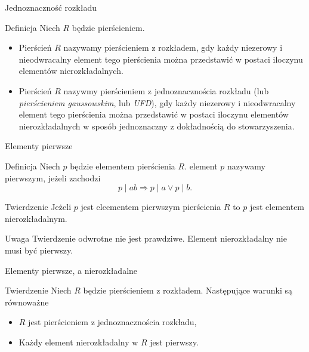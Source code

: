 \documentclass{beamer}
\begin{document}
\begin{frame}{Jednoznaczność rozkładu}
    \begin{block}{Definicja}
        Niech $R$ będzie pierścieniem. 
        \begin{itemize}
            \item Pierścień $R$ nazywamy pierścieniem z rozkładem, gdy każdy niezerowy i nieodwracalny element tego pierścienia można przedstawić w postaci iloczynu elementów nierozkładalnych.
            \item Pierścień $R$ nazywmy \alert{pierścieniem z jednoznacznościa rozkładu} (lub 
            \textit{pierścieniem gaussowskim}, lub \textit{UFD}), gdy każdy niezerowy i nieodwracalny element tego pierścienia można
            przedstawić w postaci iloczynu elementów nierozkładalnych w sposób jednoznaczny z dokładnością do stowarzyszenia.
        \end{itemize}
    \end{block}
\end{frame}

\begin{frame}{Elementy pierwsze}
    \begin{block}{Definicja}
        Niech $p$ będzie elementem pierścienia $R$. element $p$ nazywamy \alert{pierwszym}, jeżeli zachodzi 
        $$p \mid ab \Rightarrow p \mid a \lor p \mid b.$$
    \end{block}
    \pause 
    \begin{block}{Twierdzenie}
        Jeżeli $p$ jest eleementem pierwszym pierścienia $R$ to $p$ jest elementem nierozkładalnym. 
    \end{block}
    \pause 
    \begin{alertblock}{Uwaga}
        Twierdzenie odwrotne nie jest prawdziwe. Element nierozkładalny nie musi być pierwszy.
    \end{alertblock}
\end{frame}

\begin{frame}{Elementy pierwsze, a nierozkładalne}
    \begin{block}{Twierdzenie}
        Niech $R$ będzie pierścieniem z rozkładem. Następujące warunki są równoważne
        \begin{itemize}
            \item $R$ jest pierścieniem z jednoznacznościa rozkładu, 
            \item Każdy element nierozkładalny w $R$ jest pierwszy.
        \end{itemize}
    \end{block}
\end{frame}
\end{document}
